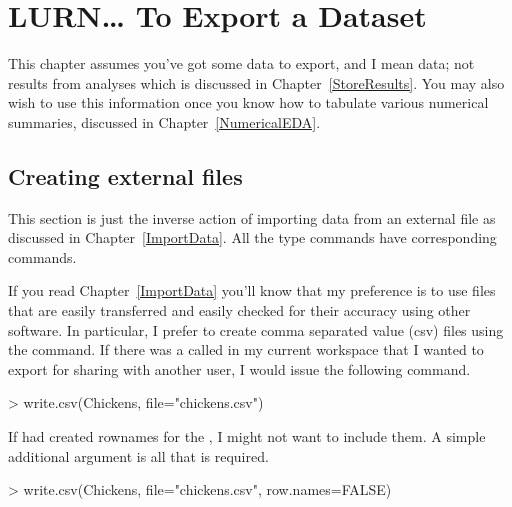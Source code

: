 



\chapter{LURN\ldots{} To Export a Dataset} 
\label{ExportData} 
 

 
This chapter assumes you've got some data to export, and I mean data; not results from analyses which is discussed in Chapter~\ref{StoreResults}. You may also wish to use this information once you know how to tabulate various numerical summaries, discussed in Chapter~\ref{NumericalEDA}. 
 
\section{Creating external files} 
 
This section is just the inverse action of importing data from an external file as discussed in Chapter~\ref{ImportData}. All the  type commands have corresponding  commands. 
 
If you read Chapter~\ref{ImportData} you'll know that my preference is to use files that are easily transferred and easily checked for their accuracy using other software. In particular, I prefer to create comma separated value (csv) files using the  command. If there was a  called  in my current workspace that I wanted to export for sharing with another user, I would issue the following command. 

\begin{Schunk}
\begin{Sinput}
> write.csv(Chickens, file="chickens.csv") 
\end{Sinput}
\end{Schunk}

If \R{} had created rownames for the , I might not want to include them. A simple additional argument is all that is required. 

\begin{Schunk}
\begin{Sinput}
> write.csv(Chickens, file="chickens.csv", row.names=FALSE) 
\end{Sinput}
\end{Schunk}

